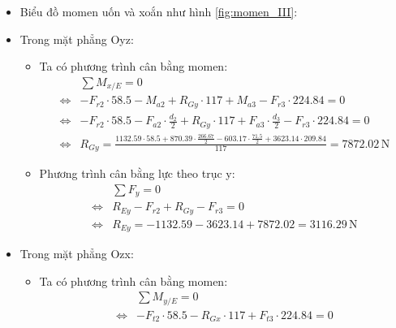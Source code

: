                 \newpage
                \begin{itemize}
                    \item Biểu đồ momen uốn và xoắn như hình \ref{fig:momen_III}:
                    \item Trong mặt phẳng Oyz:
                        \begin{itemize}
                            \item Ta có phương trình cân bằng momen:
                                \begin{align*}
                                    &\sum{M_{x/E}} = 0 \\
                                    \Leftrightarrow& -F_{r2} \cdot 58.5 - M_{a2} + R_{Gy} \cdot 117 + M_{a3} - F_{r3} \cdot 224.84 = 0 \\
                                    \Leftrightarrow& -F_{r2} \cdot 58.5 - F_{a2} \cdot \frac{d_2}{2} + R_{Gy} \cdot 117 + F_{a3} \cdot \frac{d_3}{2} - F_{r3} \cdot 224.84 = 0 \\
                                    \Leftrightarrow& R_{Gy} = \frac{1132.59 \cdot 58.5 + 870.39 \cdot \frac{266.67}{2} - 603.17 \cdot \frac{71.5}{2} + 3623.14 \cdot 209.84}{117} = 7872.02 \, \mathrm{N}
                                \end{align*}
                            \item Phương trình cân bằng lực theo trục y:
                                \begin{align*}
                                    &\sum{F_{y}} = 0 \\
                                    \Leftrightarrow& R_{Ey} - F_{r2} + R_{Gy} - F_{r3} = 0 \\
                                    \Leftrightarrow& R_{Ey} = - 1132.59 - 3623.14 + 7872.02 = 3116.29 \, \mathrm{N}
                                \end{align*}
                        \end{itemize}
                    \item Trong mặt phẳng Ozx:
                        \begin{itemize}
                            \item Ta có phương trình cân bằng momen:
                                \begin{align*}
                                    &\sum{M_{y/E}} = 0 \\
                                    \Leftrightarrow& -F_{t2} \cdot 58.5 - R_{Gx} \cdot 117 + F_{t3} \cdot 224.84 = 0 \\

\end{align*}
\end{itemize}
\end{itemize}
